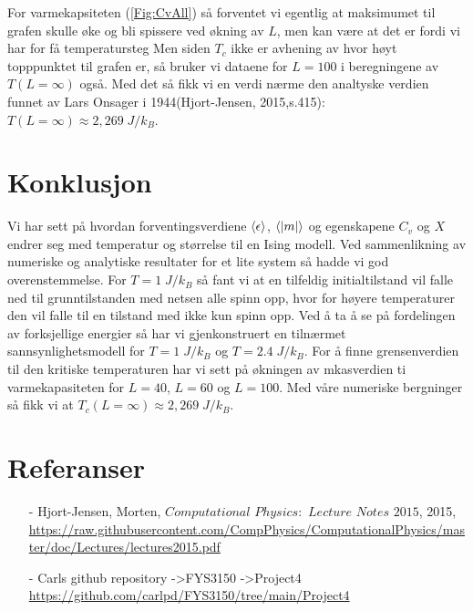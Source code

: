 \documentclass[reprint,english,notitlepage]{revtex4-2}  %
\begin{document}
For varmekapsiteten (\autoref{Fig:CvAll}) så forventet vi egentlig at maksimumet til grafen skulle øke og bli spissere ved økning av $L$, men kan være at det er fordi vi har for få temperatursteg  Men siden  $T_c$ ikke er avhening av hvor høyt topppunktet til grafen er, så bruker vi dataene for $L = 100$ i beregningene av $T \left ( L = \infty \right ) $ også. Med det så fikk vi en verdi nærme den analtyske verdien funnet av Lars Onsager i 1944(Hjort-Jensen, 2015,s.415): $T \left ( L = \infty \right ) \approx 2,269 \; J/k_B$.


\section{Konklusjon}

Vi har sett på hvordan forventingsverdiene $\expval{\epsilon}$, $\expval{|m|}$ og egenskapene $C_v$ og $X$ endrer seg med temperatur og størrelse til en Ising modell. Ved sammenlikning av numeriske og analytiske resultater for et lite system så hadde vi god overenstemmelse. For $T = 1 \; J/k_B$ så fant vi at en tilfeldig initialtilstand vil falle ned til grunntilstanden med netsen alle spinn opp, hvor for høyere temperaturer den vil falle til en tilstand med ikke kun spinn opp. Ved å ta å se på fordelingen av forksjellige energier så har vi gjenkonstruert en tilnærmet sannsynlighetsmodell for $T = 1 \; J/k_B$ og $T = 2.4 \; J/k_B$. For å finne grensenverdien til den kritiske temperaturen har vi sett på økningen av mkasverdien ti varmekapasiteten for $L = 40$, $L = 60$ og $L=100$. Med våre numeriske bergninger så fikk vi at $T_c \left (L = \infty \right ) \approx 2,269 \; J/k_B$.
\section*{Referanser}  %
\begin{itemize}
\item[-]Hjort-Jensen, Morten, $Computational$ $Physics:$ $Lecture$ $Notes$ $2015$, 2015, \url{https://raw.githubusercontent.com/CompPhysics/ComputationalPhysics/master/doc/Lectures/lectures2015.pdf}
\item[-] Carls github repository ->FYS3150 ->Project4 \url{https://github.com/carlpd/FYS3150/tree/main/Project4}
\end{itemize}
\newpage
\end{document}
